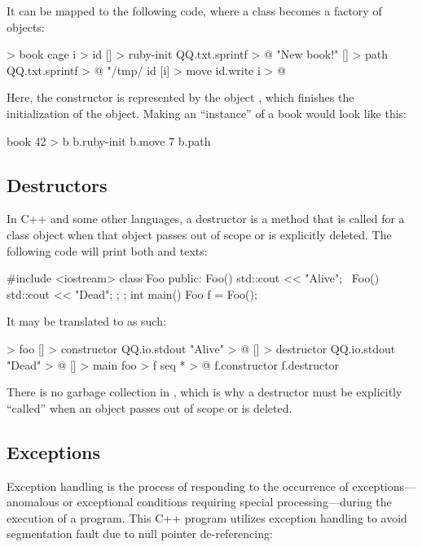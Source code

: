 \documentclass[sigplan,nonacm]{acmart}
\begin{document}
It can be mapped to the following \eolang{} code, where a class becomes a factory of objects:

\begin{ffcode}
[i] > book
  cage i > id
  [] > ruby-init
    QQ.txt.sprintf > @
      "New book!"
  [] > path
    QQ.txt.sprintf > @
      "/tmp/%
      id
  [i] > move
    id.write i > @
\end{ffcode}

Here, the constructor is represented by the object , which finishes the initialization of the object. Making an ``instance'' of a book would look like this:

\begin{ffcode}
book 42 > b
b.ruby-init
b.move 7
b.path
\end{ffcode}

\subsection{Destructors}
\label{sec:destructors}

In C++ and some other languages, a destructor is a method that is called for a class object when that object passes out of scope or is explicitly deleted. The following code will print both  and  texts:

\begin{ffcode}
#include <iostream>
class Foo {
public:
  Foo() { std::cout << "Alive"; }
  ~Foo() { std::cout << "Dead"; };
};
int main() {
  Foo f = Foo();
}
\end{ffcode}

It may be translated to \eolang{} as such:

\begin{ffcode}
[] > foo
  [] > constructor
    QQ.io.stdout "Alive" > @
  [] > destructor
    QQ.io.stdout "Dead" > @
[] > main
  foo > f
  seq * > @
    f.constructor
    f.destructor
\end{ffcode}

There is no garbage collection in \eolang{}, which is why a destructor must be explicitly ``called'' when an object passes out of scope or is deleted.

\subsection{Exceptions}
\label{sec:exceptions}

Exception handling is the process of responding to the occurrence of exceptions---anomalous or exceptional conditions requiring special processing---during the execution of a program. This C++ program utilizes exception handling to avoid segmentation fault due to null pointer de-referencing:
\end{document}
